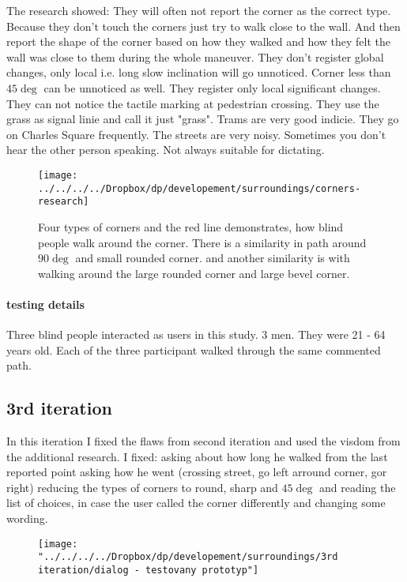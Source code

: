 				The research showed:
					They will often not report the corner as the correct type. Because they don't touch the corners just try to walk close to the wall. And then report the shape of the corner based on how they walked and how they felt the wall was close to them during the whole maneuver.
					They don't register global changes, only local i.e. long slow inclination will go unnoticed. Corner less than $45\deg$ can be unnoticed as well.
					They register only local significant changes.
					They can not notice the tactile marking at pedestrian crossing.
					They use the grass as signal linie and call it just "grass".
					Trams are very good indicie. They go on Charles Square frequently.
					The streets are very noisy. Sometimes you don't hear the other person speaking. Not always suitable for dictating.
					
					
					\begin{figure}[th]
						\centering
						\texttt{[image: ../../../../Dropbox/dp/developement/surroundings/corners-research]}
						\caption{Four types of corners and the red line demonstrates, how blind people walk around the corner. There is a similarity in path around $90\deg$ and small rounded corner. and another similarity is with walking around the large rounded corner and large bevel corner.}
						\label{fig:corners-research}
					\end{figure}
				
				\paragraph{testing details}
					Three blind people interacted as users in this study. 3 men. They were 21 - 64 years old. Each of the three participant walked through the same commented path.
			\subsection{3rd iteration}
				In this iteration I fixed the flaws from second iteration and used the visdom from the additional research.
				I fixed:
					asking about how long he walked from the last reported point
					asking how he went (crossing street, go left arround corner, gor right)
					reducing the types of corners to round, sharp and $45\deg$ and reading the list of choices, in case the user called the corner differently
					and changing some wording.
									
				
				\begin{figure}[th]
					\centering
					\texttt{[image: "../../../../Dropbox/dp/developement/surroundings/3rd iteration/dialog - testovany prototyp"]}
					\caption{}
					\label{fig:dialog---testovany-prototyp}
				\end{figure}
			
